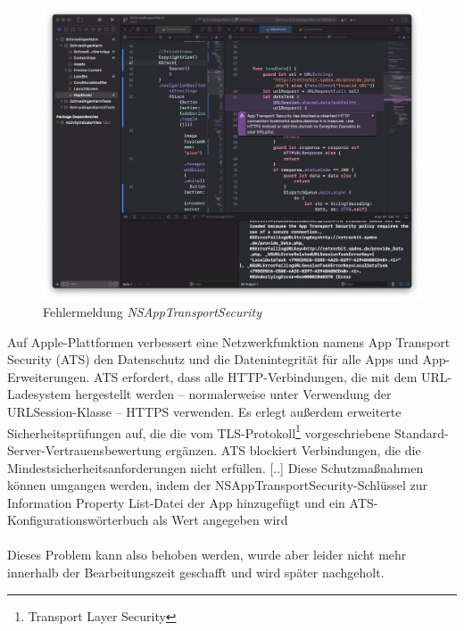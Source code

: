 \begin{figure} [H]
	\begin{center}
		\includegraphics[width=1\textwidth]{Bilder/iOS_fehlermeldung.png}
		\caption{Fehlermeldung \textit{NSAppTransportSecurity}}
		\label{fehler}
	\end{center}
\end{figure}
Auf Apple-Plattformen verbessert eine Netzwerkfunktion namens App Transport Security (ATS) den Datenschutz und die Datenintegrität für alle Apps und App-Erweiterungen. ATS erfordert, dass alle HTTP-Verbindungen, die mit dem URL-Ladesystem hergestellt werden – normalerweise unter Verwendung der URLSession-Klasse – HTTPS verwenden. Es erlegt außerdem erweiterte Sicherheitsprüfungen auf, die die vom TLS-Protokoll\footnote{Transport Layer Security} vorgeschriebene Standard-Server-Vertrauensbewertung ergänzen. ATS blockiert Verbindungen, die die Mindestsicherheitsanforderungen nicht erfüllen. [..] Diese Schutzmaßnahmen können umgangen werden, indem der NSAppTransportSecurity-Schlüssel zur Information Property List-Datei der App hinzugefügt und ein ATS-Konfigurationswörterbuch als Wert angegeben wird \cite{Inc}
\\
\\
Dieses Problem kann also behoben werden, wurde aber leider nicht mehr innerhalb der Bearbeitungszeit geschafft und wird später nachgeholt.